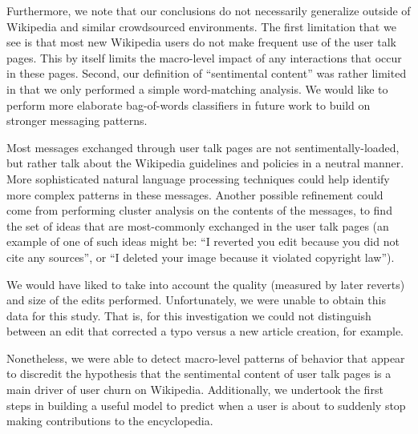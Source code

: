 \documentclass[letterpaper, 10 pt, conference]{ieeeconf}  %
\begin{document}
Furthermore, we note that our conclusions do not necessarily generalize outside of Wikipedia and similar crowdsourced environments. The first limitation that we see is that most new Wikipedia users do not make frequent use of the user talk pages. This by itself limits the macro-level impact of any interactions that occur in these pages. Second, our definition of “sentimental content” was rather limited in that we only performed a simple word-matching analysis. We would like to perform more elaborate bag-of-words classifiers in future work to build on stronger messaging patterns.

Most messages exchanged through user talk pages are not sentimentally-loaded, but rather talk about the Wikipedia guidelines and policies in a neutral manner.  More sophisticated natural language processing techniques could help identify more complex patterns in these messages. Another possible refinement could come from performing cluster analysis on the contents of the messages, to find the set of ideas that are most-commonly exchanged in the user talk pages (an example of one of such ideas might be: “I reverted you edit because you did not cite any sources”, or “I deleted your image because it violated copyright law”).

We would have liked to take into account the quality (measured by later reverts) and size of the edits performed. Unfortunately, we were unable to obtain this data for this study. That is, for this investigation we could not distinguish between an edit that corrected a typo versus a new article creation, for example.

Nonetheless, we were able to detect macro-level patterns of behavior that appear to discredit the hypothesis that the sentimental content of user talk pages is a main driver of user churn on Wikipedia. Additionally, we undertook the first steps in building a useful model to predict when a user is about to suddenly stop making contributions to the encyclopedia.


\addtolength{\textheight}{-12cm}   %
\end{document}
